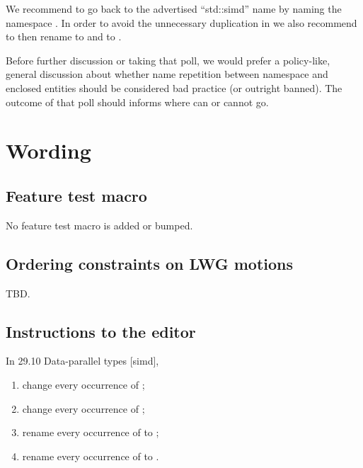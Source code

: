 We recommend to go back to the advertised “std::simd” name by naming the namespace
.
In order to avoid the unnecessary duplication in \stdsimd{} we also recommend to
then rename \stdsimd{} to \stdsimd{} and \stdsimd{}
to \stdsimd{}.

Before further discussion or taking that poll, we would prefer a policy-like, general discussion
about whether name repetition between namespace and enclosed entities should be considered bad
practice (or outright banned).
The outcome of that poll should informs where  can or cannot go.

\section{Wording}

\subsection{Feature test macro}

No feature test macro is added or bumped.

\subsection{Ordering constraints on LWG motions}

TBD.

\subsection{Instructions to the editor}

In 29.10 Data-parallel types [simd],

\begin{enumerate}
  \item change every occurrence of ;
  \item change every occurrence of ;
  \item rename every occurrence of  to ;
  \item rename every occurrence of  to .
\end{enumerate}


